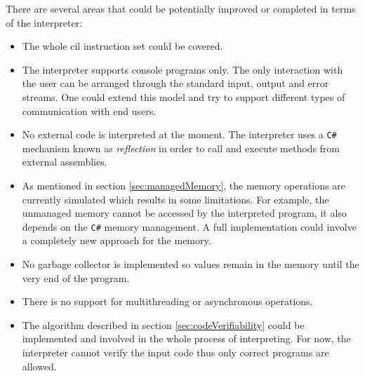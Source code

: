 \documentclass[declaration,shortabstract,english,mgr]{iithesis}
\begin{document}
There are several areas that could be potentially improved or completed in terms of the interpreter:
\begin{itemize}
	\item{The whole \acrshort{cil} instruction set could be covered.}
	\item{The interpreter supports console programs only. The only interaction with the user can be arranged through the standard input, output and error streams. One could extend this model and try to support different types of communication with end users.}
	\item{No external code is interpreted at the moment. The interpreter uses a \texttt{C\#} mechanism known as \textit{reflection} in order to call and execute methods from external assemblies.}
	\item{As mentioned in section \ref{sec:managedMemory}, the memory operations are currently simulated which results in some limitations. For example, the unmanaged memory cannot be accessed by the interpreted program, it also depends on the \texttt{C\#} memory management. A full implementation could involve a completely new approach for the memory.}
	\item{No garbage collector is implemented so values remain in the memory until the very end of the program.}
	\item{There is no support for multithreading or asynchronous operations.}
	\item{The algorithm described in section \ref{sec:codeVerifiability} could be implemented and involved in the whole process of interpreting. For now, the interpreter cannot verify the input code thus only correct programs are allowed.}
\end{itemize}

\clearpage


\renewcommand{\refname}{Bibliography}

{}


\end{document}
